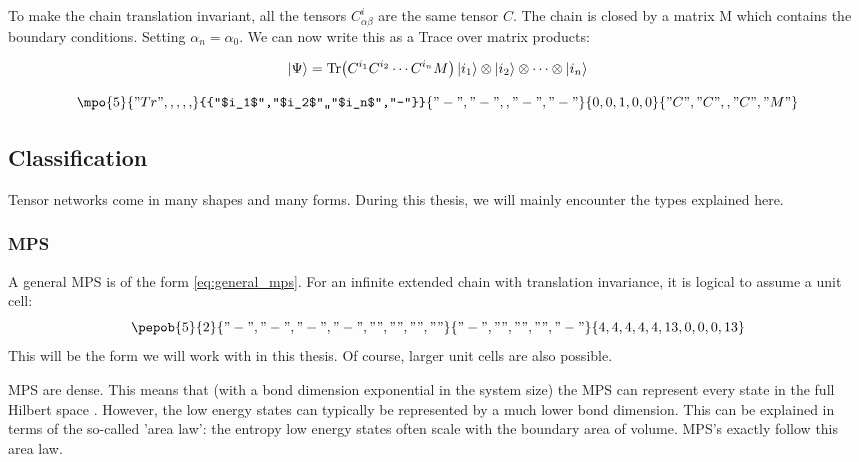 To make the chain translation invariant, all the tensors $C^i_{\alpha \beta }$ are the same tensor $C$. The chain is closed by a matrix M which contains the boundary conditions. Setting $\alpha_n = \alpha_0$. We can now write this as a Trace over matrix products:

\begin{equation}
    \ket{\Psi} = \Tr( C^{i_1} C^{i_2} \cdots C^{i_n} M  ) \ket{i_1} \otimes \ket{i_2} \otimes \cdots \otimes \ket{i_n}
\end{equation}

\begin{equation}\label{eq:general_mps}
    \mpo{5}{{"Tr",,,,,}}{{"$i_1$","$i_2$",,"$i_n$","-"}}{{"-","-",,"-","-"}}{{0,0,1,0,0}}{{"C", "C",,"C","M" }}
\end{equation}

\subsection{Classification}

Tensor networks come in many shapes and many forms. During this thesis, we will mainly encounter the types explained here.

\subsubsection{MPS}

A general MPS is of the form \cref{eq:general_mps}. For an infinite extended chain with translation invariance, it is logical to assume a unit cell:
\begin{equation}\label{mps:uni}
    \pepob{5}{2}{{
                "-","-", "-","-",
                "","","",""}}{{
                "-",
                "",
                "",
                "",
                "-"}}{{
                4,4,4,4,4,
                13,0,0,0,13}}
\end{equation}
This will be the form we will work with in this thesis. Of course, larger unit cells are also possible.

MPS are dense. This means that (with a bond dimension exponential in the system size) the MPS can represent every state in the full Hilbert space \cite{Orus2014}. However, the low energy states can typically be represented by a much lower bond dimension. This can be explained in terms of the so-called 'area law': the entropy low energy states often scale with the boundary area of volume. MPS's exactly follow this area law.

